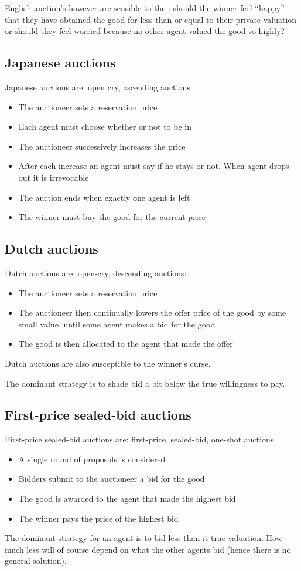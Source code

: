 English auction's however are sensible to the : should the winner feel ``happy'' that they have obtained the good for less than or equal to their private valuation or should they feel worried because no other agent valued the good so highly?

\subsection{Japanese auctions}
Japanese auctions are: open cry, ascending auctions
\begin{itemize}
\item The auctioneer sets a reservation price
\item Each agent must choose whether or not to be in
\item The auctioneer successively increases the price
\item After each increase an agent must say if he stays or not. When agent drops out it is irrevocable
\item The auction ends when exactly one agent is left
\item The winner must buy the good for the current price
\end{itemize}

\subsection{Dutch auctions}
Dutch auctions are: open-cry, descending auctions:
\begin{itemize}
\item The auctioneer sets a reservation price
\item The auctioneer then continually lowers the offer price of the good by some small value, until some agent makes a bid for the good
\item The good is then allocated to the agent that made the offer
\end{itemize}
Dutch auctions are also susceptible to the winner's curse.

The dominant strategy is to shade bid a bit below the true willingness to pay.
\subsection{First-price sealed-bid auctions}
First-price sealed-bid auctions are: first-price, sealed-bid, one-shot auctions.
\begin{itemize}
\item A single round of proposals is considered
\item Bidders submit to the auctioneer a bid for the good
\item The good is awarded to the agent that made the highest bid
\item The winner pays the price of the highest bid
\end{itemize}
The dominant strategy for an agent is to bid less than it true valuation. How much less will of course depend on what the other agents bid (hence there is no general solution).

